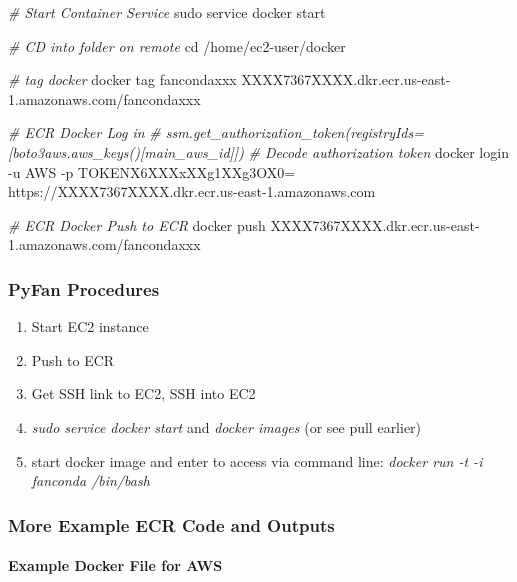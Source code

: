 \documentclass[
]{book}
\newenvironment{Shaded}{\begin{snugshade}}{\end{snugshade}}
\newcommand{\BuiltInTok}[1]{#1}
\newcommand{\CommentTok}[1]{\textcolor[rgb]{0.56,0.35,0.01}{\textit{#1}}}
\newcommand{\ExtensionTok}[1]{#1}
\newcommand{\FunctionTok}[1]{\textcolor[rgb]{0.00,0.00,0.00}{#1}}
\newcommand{\NormalTok}[1]{#1}
\providecommand{\tightlist}{%
  \setlength{\itemsep}{0pt}\setlength{\parskip}{0pt}}
\begin{document}
\begin{Shaded}
\begin{Highlighting}[]
\CommentTok{\# Start Container Service}
\FunctionTok{sudo}\NormalTok{ service docker start}

\CommentTok{\# CD into folder on remote}
\BuiltInTok{cd}\NormalTok{ /home/ec2{-}user/docker}

\CommentTok{\# tag docker}
\ExtensionTok{docker}\NormalTok{ tag fancondaxxx XXXX7367XXXX.dkr.ecr.us{-}east{-}1.amazonaws.com/fancondaxxx}

\CommentTok{\# ECR Docker Log in}
\CommentTok{\# ssm.get\_authorization\_token(registryIds=[boto3aws.aws\_keys()[\textquotesingle{}main\_aws\_id\textquotesingle{}]])}
\CommentTok{\# Decode authorization token}
\ExtensionTok{docker}\NormalTok{ login {-}u AWS {-}p TOKENX6XXXxXXg1XXg3OX0= https://XXXX7367XXXX.dkr.ecr.us{-}east{-}1.amazonaws.com}

\CommentTok{\# ECR Docker Push to ECR}
\ExtensionTok{docker}\NormalTok{ push XXXX7367XXXX.dkr.ecr.us{-}east{-}1.amazonaws.com/fancondaxxx}
\end{Highlighting}
\end{Shaded}

\hypertarget{pyfan-procedures}{%
\subsubsection{PyFan Procedures}\label{pyfan-procedures}}

\begin{enumerate}
\def\labelenumi{\arabic{enumi}.}
\tightlist
\item
  Start EC2 instance
\item
  Push to ECR
\item
  Get SSH link to EC2, SSH into EC2
\item
  \emph{sudo service docker start} and \emph{docker images} (or see pull earlier)
\item
  start docker image and enter to access via command line: \emph{docker run -t -i fanconda /bin/bash}
\end{enumerate}

\hypertarget{more-example-ecr-code-and-outputs}{%
\subsubsection{More Example ECR Code and Outputs}\label{more-example-ecr-code-and-outputs}}

\hypertarget{example-docker-file-for-aws}{%
\paragraph{Example Docker File for AWS}\label{example-docker-file-for-aws}}
\end{document}
